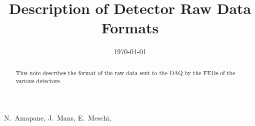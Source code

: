 \documentclass[a4paper]{cmspaper}
\newcommand{\pdfbookmark}[3][1]{}
\begin{document}
\begin{titlepage}

  \date{\today}

  \title{Description of Detector Raw Data Formats}
  \begin{Authlist}
    N.~Amapane,
    J.~Mans,
    E.~Meschi,
    
  \end{Authlist}

  \begin{abstract}
    \pdfbookmark[1]{Abstract}{Abstract}
    This note describes the format of the raw data sent to the DAQ by
    the FEDs of the various detectors.
  \end{abstract} 
  
\end{titlepage}

\setcounter{page}{2}

\linenumbers %

 
 








 

 


\end{document}
